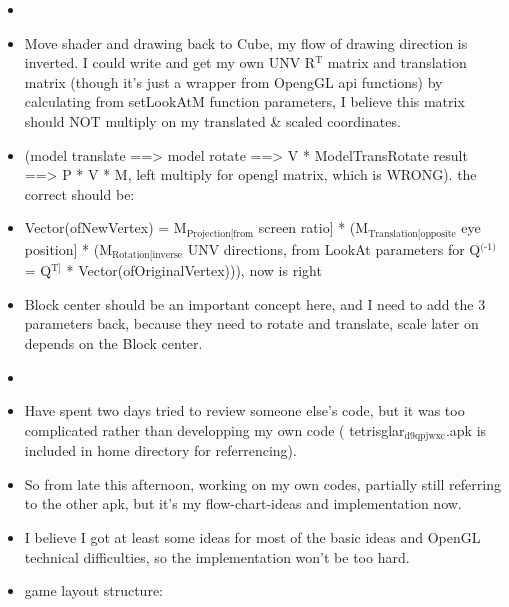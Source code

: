 \documentclass[9pt,b5paper]{article}
\begin{document}
\begin{itemize}
\begin{itemize}
\item 
\item Move shader and drawing back to Cube, my flow of drawing direction is inverted. I could write and get my own UNV R$^{\text{T}}$ matrix and translation matrix (though it's just a wrapper from OpengGL api functions) by calculating from setLookAtM function parameters, I believe this matrix should NOT multiply on my translated \& scaled coordinates.
\item (model translate ==> model rotate ==> V * ModelTransRotate result ==> P * V * M, left multiply for opengl matrix, which is WRONG). the correct should be:
\item Vector(ofNewVertex) = M$_{\text{Projection[from}}$ screen ratio] * (M$_{\text{Translation[opposite}}$ eye position] * (M$_{\text{Rotation[inverse}}$ UNV directions, from LookAt parameters for Q$^{\text{(-1)}}$ = Q$^{\text{T]}}$ * Vector(ofOriginalVertex))), now is right
\item Block center should be an important concept here, and I need to add the 3 parameters back, because they need to rotate and translate, scale later on depends on the Block center.
\item 
\item Have spent two days tried to review someone else's code, but it was too complicated rather than developping my own code ( tetrisglar$_{\text{d9qpjwxc}}$.apk is included in home directory for referrencing).
\item So from late this afternoon, working on my own codes, partially still referring to the other apk, but it's my flow-chart-ideas and implementation now.
\item I believe I got at least some ideas for most of the basic ideas and OpenGL technical difficulties, so the implementation won't be too hard.
\item game layout structure:
\end{itemize}

\end{itemize}
\end{document}
